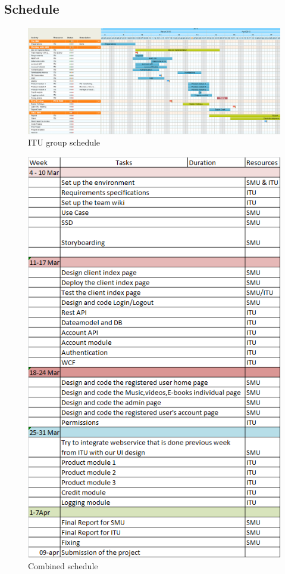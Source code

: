\subsection{Schedule}
\label{schedule}
\begin{figure}[t]
\includegraphics[scale=0.4]{illustrations/ItuSchedule.png}
\caption{ITU group schedule}
\end{figure}
\begin{figure}[t]
\includegraphics{illustrations/SmuSchedule.png}
\caption{Combined schedule}
\end{figure}